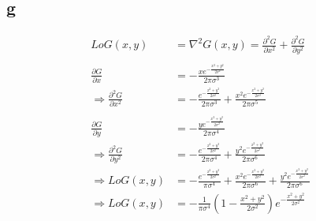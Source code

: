 \documentclass[11pt]{article}
\begin{document}
\subsection{g}
\label{sec:orgcbb3b38}

\begin{align*}
LoG(x,y) &= \nabla^2G(x,y) = \frac{\partial^2 G}{\partial x^2} + \frac{\partial^2 G}{\partial y^2}\\
&\\
\frac{\partial G}{\partial x}&=- \frac{x e^{-\frac{ x^{2} + y^2}{2 \sigma^{2}}}}{2 \pi \sigma^{3}} \\
\Rightarrow \frac{\partial^2 G}{\partial x^2}&=- \frac{e^{-\frac{ x^{2} + y^2}{2 \sigma^{2}}}}{2 \pi \sigma^{3}} + \frac{x^{2} e^{-\frac{ x^{2} + y^2}{2 \sigma^{2}}}}{2 \pi \sigma^{5}} \\
& \\
\frac{\partial G}{\partial y}&=-\frac{y e^{-\frac{ x^{2} + y^2}{2 \sigma^{2}}}}{2 \pi \sigma^{4}}\\
\Rightarrow \frac{\partial^2 G}{\partial y^2}&=-\frac{e^{-\frac{ x^{2} + y^2}{2 \sigma^{2}}}}{2 \pi \sigma^{4}} + \frac{y^{2} e^{-\frac{ x^{2} + y^2}{2 \sigma^{2}}}}{2 \pi \sigma^{6}}
& \\
\Rightarrow LoG(x,y) &=- \frac{e^{-\frac{ x^{2} + y^2}{2 \sigma^{2}}}}{\pi \sigma^{4}} + \frac{x^{2} e^{-\frac{ x^{2} + y^2}{2 \sigma^{2}}}}{2 \pi \sigma^{6}} + \frac{y^{2} e^{-\frac{ x^{2} + y^2}{2 \sigma^{2}}}}{2 \pi \sigma^{6}}\\
\Rightarrow LoG(x,y) &=-\frac{1}{\pi\sigma^4}\left(1-\frac{x^2+y^2}{2\sigma^2}\right)e^{-\frac{x^2+y^2}{2\sigma^{2}}}
\end{align*}
\end{document}
